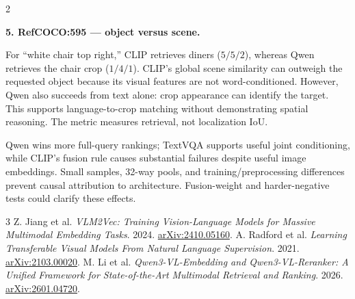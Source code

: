 \documentclass[10pt,letterpaper]{article}
\newcommand{\heading}[1]{\par\addvspace{5pt}\noindent{\normalsize\bfseries #1}\par\nobreak}
\newcommand{\case}[1]{\par\addvspace{4pt}\noindent\textbf{#1}\par\nobreak}
\begin{document}
\begin{multicols}{2}
\case{5. RefCOCO:595 --- object versus scene.}
For ``white chair top right,'' CLIP retrieves diners ($5/5/2$), whereas Qwen
retrieves the chair crop ($1/4/1$). CLIP's global scene similarity can outweigh
the requested object because its visual features are not word-conditioned.
However, Qwen also succeeds from text alone: crop appearance can identify the
target. This supports language-to-crop matching without demonstrating spatial
reasoning. The metric measures retrieval, not localization IoU.

\heading{4. Conclusion}
Qwen wins more full-query rankings; TextVQA supports useful joint conditioning,
while CLIP's fusion rule causes substantial failures despite useful image
embeddings. Small samples, 32-way pools, and training/preprocessing differences prevent
causal attribution to architecture. Fusion-weight and harder-negative tests
could clarify these effects.

\begingroup
\footnotesize
\begin{thebibliography}{3}
\setlength{\itemsep}{0pt}
\setlength{\parskip}{0pt}
 Z. Jiang et al. \emph{VLM2Vec: Training Vision-Language Models for
Massive Multimodal Embedding Tasks}. 2024.
\href{https://arxiv.org/abs/2410.05160}{arXiv:2410.05160}.
 A. Radford et al. \emph{Learning Transferable Visual Models From
Natural Language Supervision}. 2021.
\href{https://arxiv.org/abs/2103.00020}{arXiv:2103.00020}.
 M. Li et al. \emph{Qwen3-VL-Embedding and Qwen3-VL-Reranker:
A Unified Framework for State-of-the-Art Multimodal Retrieval and Ranking}. 2026.
\href{https://arxiv.org/abs/2601.04720}{arXiv:2601.04720}.
\end{thebibliography}
\endgroup
\end{multicols}
\end{document}

